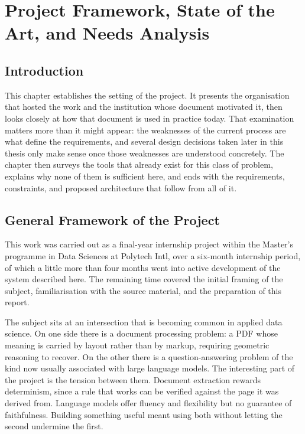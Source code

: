 \chapter{Project Framework, State of the Art, and Needs Analysis}

\section*{Introduction}

This chapter establishes the setting of the project. It presents the organisation that hosted the work and the institution whose document motivated it, then looks closely at how that document is used in practice today. That examination matters more than it might appear: the weaknesses of the current process are what define the requirements, and several design decisions taken later in this thesis only make sense once those weaknesses are understood concretely. The chapter then surveys the tools that already exist for this class of problem, explains why none of them is sufficient here, and ends with the requirements, constraints, and proposed architecture that follow from all of it.

\section{General Framework of the Project}

This work was carried out as a final-year internship project within the Master's programme in Data Sciences at Polytech Intl, over a six-month internship period, of which a little more than four months went into active development of the system described here. The remaining time covered the initial framing of the subject, familiarisation with the source material, and the preparation of this report.

The subject sits at an intersection that is becoming common in applied data science. On one side there is a document processing problem: a PDF whose meaning is carried by layout rather than by markup, requiring geometric reasoning to recover. On the other there is a question-answering problem of the kind now usually associated with large language models. The interesting part of the project is the tension between them. Document extraction rewards determinism, since a rule that works can be verified against the page it was derived from. Language models offer fluency and flexibility but no guarantee of faithfulness. Building something useful meant using both without letting the second undermine the first.

